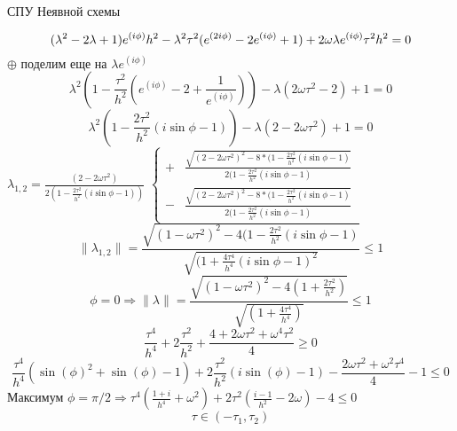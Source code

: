 \documentclass[12pt,eqnleft,executivepaper]{article}
\begin{document}
\\ \begin{center}\color{green}СПУ Неявной схемы\\	\end{center} 
$$ (\lambda^2-2\lambda+1)e^{(i \phi)}h^2-\lambda^2 \tau^2(e^{(2i \phi)}-2e^{(i \phi)}+1)+2\omega \lambda e^{(i \phi)} \tau^2 h^2 =0\\$$
$\oplus\text{ поделим еще на }\lambda e^{(i \phi)}$\\
$$\lambda^2(1-\frac{\tau^2}{h^2}( e^{(i \phi)}-2+\frac{1}{ e^{(i \phi)}}))-\lambda(2\omega \tau^2-2)+1=0$$
$$\lambda^2(1-\frac{2\tau^2}{h^2}(i\sin{\phi}-1))-\lambda(2-2\omega \tau^2)+1=0$$
$\lambda_{1,2}=\frac{(2-2\omega \tau^2)}{2(1-\frac{2\tau^2}{h^2}(i\sin{\phi}-1))}$
$\begin{cases}
+&\frac{\sqrt{(2-2\omega \tau^2)^2-8*(1-\frac{2\tau^2}{h^2}(i\sin{\phi}-1)}}{2(1-\frac{2\tau^2}{h^2}(i\sin{\phi}-1)}\\
-&\frac{\sqrt{(2-2\omega \tau^2)^2-8*(1-\frac{2\tau^2}{h^2}(i\sin{\phi}-1)}}{2(1-\frac{2\tau^2}{h^2}(i\sin{\phi}-1)}
\end{cases}$
$$\|\lambda_{1,2}\|=\frac{\sqrt{(1-\omega \tau^2)^2-4(1-\frac{2\tau^2}{h^2}(i\sin{\phi}-1)}}{\sqrt{(1+\frac{4\tau^4}{h^4}(i\sin{\phi}-1)^2}}\leq1$$
$$\phi =0 \Rightarrow \|\lambda\| = \frac{\sqrt{(1-\omega \tau^2)^2-4(1+\frac{2\tau^2}{h^2})}}{\sqrt{(1+\frac{4\tau^4}{h^4})}}\leq1$$
$$ \frac{\tau^4}{h^4}+2 \frac{\tau^2}{h^2}+\frac{4+2\omega \tau^2 +\omega^4 \tau^2}{4}\geq0$$
$$ \frac{\tau^4}{h^4}(\sin(\phi)^2+\sin(\phi)-1)+2 \frac{\tau^2}{h^2}(i\sin(\phi)-1)-\frac{2\omega \tau^2+\omega^2\tau^4}{4}-1\leq0$$
Максимум $\phi=\pi/2 \Rightarrow \tau^4(\frac{1+i}{h^4}+\omega^2)+2\tau^2(\frac{i-1}{h^2}-2\omega)-4\leq0 $
$$\tau\in (-\tau_1,\tau_2)$$
\end{document}
